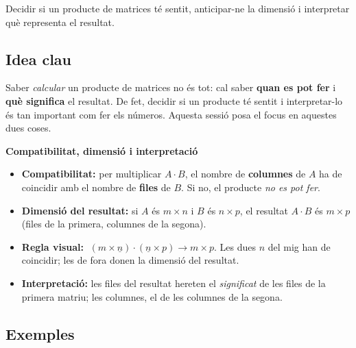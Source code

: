 %
{Decidir si un producte de matrices té sentit, anticipar-ne la dimensió i interpretar què representa el resultat.}

\subsection{Idea clau}

Saber \emph{calcular} un producte de matrices no és tot: cal saber \textbf{quan es
pot fer} i \textbf{què significa} el resultat. De fet, decidir si un producte té
sentit i interpretar-lo és tan important com fer els números. Aquesta sessió posa
el focus en aquestes dues coses.

\begin{idea}
\textbf{Compatibilitat, dimensió i interpretació}
\begin{itemize}[leftmargin=1.4em, itemsep=2pt]
  \item \textbf{Compatibilitat:} per multiplicar $A\cdot B$, el nombre de
        \textbf{columnes} de $A$ ha de coincidir amb el nombre de \textbf{files}
        de $B$. Si no, el producte \emph{no es pot fer}.
  \item \textbf{Dimensió del resultat:} si $A$ és $m\times n$ i $B$ és $n\times p$,
        el resultat $A\cdot B$ és $m\times p$ (files de la primera, columnes de la
        segona).
  \item \textbf{Regla visual:} $\;(m\times \underline{n})\cdot(\underline{n}\times p)
        \rightarrow m\times p$. Les dues $n$ del mig han de coincidir; les de fora
        donen la dimensió del resultat.
  \item \textbf{Interpretació:} les files del resultat hereten el \emph{significat}
        de les files de la primera matriu; les columnes, el de les columnes de la
        segona.
\end{itemize}
\end{idea}

\subsection{Exemples}

